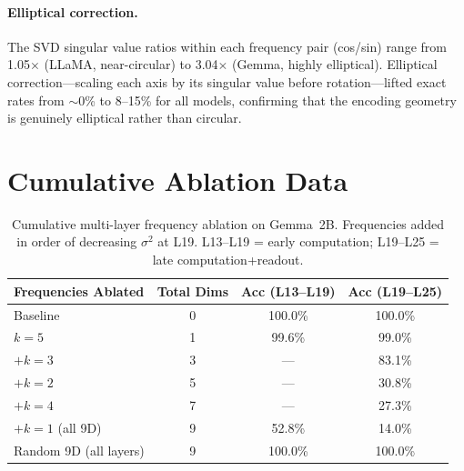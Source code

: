\paragraph{Elliptical correction.} The SVD singular value ratios within each frequency pair (cos/sin) range from 1.05$\times$ (LLaMA, near-circular) to 3.04$\times$ (Gemma, highly elliptical). Elliptical correction---scaling each axis by its singular value before rotation---lifted exact rates from $\sim$0\% to 8--15\% for all models, confirming that the encoding geometry is genuinely elliptical rather than circular.

\section{Cumulative Ablation Data}
\label{app:ablation_data}

\begin{table}[h]
\centering
\caption{Cumulative multi-layer frequency ablation on Gemma~2B. Frequencies added in order of decreasing $\sigma^2$ at L19. L13--L19 = early computation; L19--L25 = late computation+readout.}
\label{tab:cumulative}
\small
\begin{tabular}{lccc}
\toprule
\textbf{Frequencies Ablated} & \textbf{Total Dims} & \textbf{Acc (L13--L19)} & \textbf{Acc (L19--L25)} \\
\midrule
Baseline & 0 & 100.0\% & 100.0\% \\
$k{=}5$ & 1 & 99.6\% & 99.0\% \\
$+k{=}3$ & 3 & --- & 83.1\% \\
$+k{=}2$ & 5 & --- & 30.8\% \\
$+k{=}4$ & 7 & --- & 27.3\% \\
$+k{=}1$ (all 9D) & 9 & 52.8\% & 14.0\% \\
\midrule
Random 9D (all layers) & 9 & 100.0\% & 100.0\% \\
\bottomrule
\end{tabular}
\end{table}
